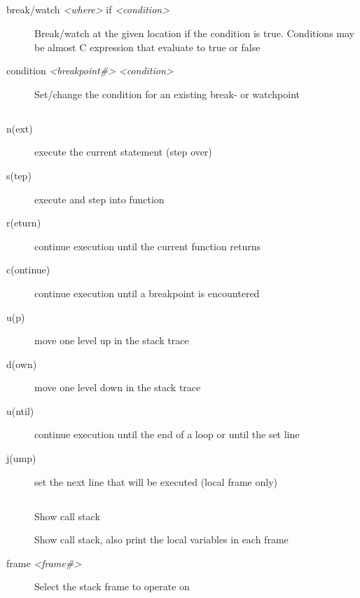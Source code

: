 \documentclass[10pt,landscape,a4paper]{article}
\newcommand{\blacksubsection}[1]{\subsection{\colorbox{black}{\makebox[\linewidth][c]{\textcolor{white}{#1}}}}}
\begin{document}
\begin{multicols}{3}
    \blacksubsection{Conditions}
      \begin{description}
        \item[break/watch \textit{<where>} if \textit{<condition>}]
              Break/watch at the given location if the condition is true. Conditions may be
              almost C expression that evaluate to true or false
        \item[condition \textit{<breakpoint\#>} \textit{<condition>}]
              Set/change the condition for an existing break- or watchpoint
        \item[]   
      \end{description}

    \blacksubsection{Movement}
      \begin{description}
        \item[n(ext)] execute the current statement (step over)
        \item[s(tep)] execute and step into function
        \item[r(eturn)] continue execution until the current function returns
        \item[c(ontinue)] continue execution until a breakpoint is encountered
        \item[u(p)] move one level up in the stack trace
        \item[d(own)] move one level down in the stack trace
        \item[u(ntil)] continue execution until the end of a loop or until the set line
        \item[j(ump)] set the next line that will be executed (local frame only)
      \end{description}

    \blacksubsection{Examining the stack}
      \begin{description}
        \item[\parbox{4cm}{ \vspace{0.1cm} b(ack)t(race) \\ where \vspace{0.1cm}}] Show call stack
        \item[\parbox{4cm}{ \vspace{0.1cm} backtrace full \\ where full \vspace{0.1cm}}] Show call stack, also print the local variables in each frame
        \item[frame \textit{<frame\#>}] Select the stack frame to operate on
      \end{description}


\end{multicols}
\end{document}
